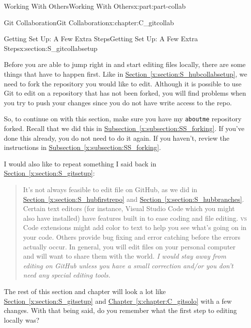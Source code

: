 \documentclass[oneside,10pt,]{book}
\newcommand{\xreffont}{\relax}
\newcommand{\mono}[1]{\texttt{#1}}
\newcommand{\initialism}[1]{\textsc{\MakeLowercase{#1}}}
\begin{document}
\begin{partptx}{Working With Others}{}{Working With Others}{}{}{x:part:part-collab}
\begin{chapterptx}{Git Collaboration}{}{Git Collaboration}{}{}{x:chapter:C_gitcollab}
\begin{introduction}{}
\end{introduction}%
%
%
\typeout{************************************************}
\typeout{************************************************}
%
\begin{sectionptx}{Getting Set Up: A Few Extra Steps}{}{Getting Set Up: A Few Extra Steps}{}{}{x:section:S_gitcollabsetup}
%
\begin{introduction}{}%
Before you are able to jump right in and start editing files locally, there are some things that have to happen first. Like in \hyperref[x:section:S_hubcollabsetup]{Section~{\xreffont\ref{x:section:S_hubcollabsetup}}}, we need to fork the repository you would like to edit. Although it is possible to use Git to edit on a repository that has not been forked, you will find problems when you try to push your changes since you do not have write access to the repo.%
\par
So, to continue on with this section, make sure you have my \mono{aboutme} repository forked. Recall that we did this in \hyperref[x:subsection:SS_forking]{Subsection~{\xreffont\ref{x:subsection:SS_forking}}}. If you've done this already, you do not need to do it again. If you haven't, review the instructions in \hyperref[x:subsection:SS_forking]{Subsection~{\xreffont\ref{x:subsection:SS_forking}}}.%
\par
I would also like to repeat something I said back in \hyperref[x:section:S_gitsetup]{Section~{\xreffont\ref{x:section:S_gitsetup}}}: \begin{quote}%
It's not always feasible to edit file on GitHub, as we did in \hyperref[x:section:S_hubfirstrepo]{Section~{\xreffont\ref{x:section:S_hubfirstrepo}}} and \hyperref[x:section:S_hubbranches]{Section~{\xreffont\ref{x:section:S_hubbranches}}}. Certain text editors (for instance, Visual Studio Code which you might also have installed) have features built in to ease coding and file editing. \initialism{VS} Code extensions might add color to text to help you see what's going on in your code. Others provide bug fixing and error catching before the errors actually occur. In general, you will edit files on your personal computer and will want to share them with the world. \emph{I would stay away from editing on GitHub unless you have a small correction and\slash{}or you don't need any special editing tools.}%
\end{quote}
%
\par
The rest of this section and chapter will look a lot like \hyperref[x:section:S_gitsetup]{Section~{\xreffont\ref{x:section:S_gitsetup}}} and \hyperref[x:chapter:C_gitsolo]{Chapter~{\xreffont\ref{x:chapter:C_gitsolo}}} with a few changes. With that being said, do you remember what the first step to editing locally was?%

\end{introduction}
\end{sectionptx}
\end{chapterptx}
\end{partptx}
\end{document}
